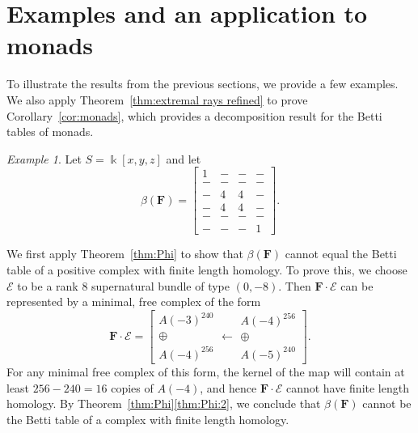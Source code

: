 \documentclass[12pt]{amsart}
\theoremstyle{definition}
\theoremstyle{remark}
\newtheorem{example}[lemma]{Example}
\newcommand{\kk}{\Bbbk}
\newcommand{\PP}{\mathbb{P}}
\newcommand{\cO}{\mathcal{O}}
\newcommand{\cE}{\mathcal{E}}
\newcommand{\FF}{\mathbf{F}}
\newcommand{\Sym}{\operatorname{Sym}} %
\begin{document}
\section{Examples and an application to monads}\label{sec:examples}
To illustrate the results from the previous sections, we provide a few examples.  We also apply Theorem~\ref{thm:extremal rays refined} to prove Corollary~\ref{cor:monads}, which provides a decomposition result for the Betti tables of monads.
\begin{example}\label{ex:1441}
Let $S=\kk[x,y,z]$ and let
\begin{equation}\label{eqn:intro ex}
\beta(\FF)=\begin{bmatrix} 1&-&-&-\\ -&-&-&-\\-&4&4&-\\-&4&4&-\\-&-&-&-\\-&-&-&1 \end{bmatrix}.
\end{equation}


We first apply Theorem~\ref{thm:Phi} to show that $\beta(\FF)$ cannot equal the Betti table of a positive complex with finite length homology.  To prove this, we choose $\cE$ to be a rank $8$ supernatural bundle of type $(0,-8)$.  
Then $\FF\cdot \cE$ can be represented by a minimal, free complex of the form
\[
\FF\cdot \cE=\left[ \begin{matrix}A(-3)^{240}\\ \oplus \\A(-4)^{256}\end{matrix} \longleftarrow \begin{matrix}A(-4)^{256}\\\oplus \\ A(-5)^{240}\end{matrix}\right].
\]
For any minimal free complex of this form, the kernel of the map will contain at least $256-240=16$ copies of $A(-4)$, and hence $\FF\cdot \cE$ cannot have finite length homology.  By Theorem~\ref{thm:Phi}\eqref{thm:Phi:2}, we conclude that $\beta(\FF)$ cannot be the Betti table of a complex with finite length homology.


\end{example}
\end{document}
